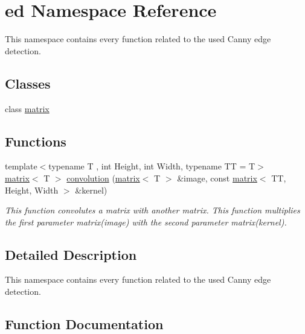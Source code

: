 \hypertarget{namespaceed}{}\section{ed Namespace Reference}
\label{namespaceed}


This namespace contains every function related to the used Canny edge detection.  


\subsection*{Classes}
\begin{DoxyCompactItemize}
\item 
class \mbox{\hyperlink{classed_1_1matrix}{matrix}}
\end{DoxyCompactItemize}
\subsection*{Functions}
\begin{DoxyCompactItemize}
\item 
{\footnotesize template$<$typename T , int Height, int Width, typename TT  = T$>$ }\\\mbox{\hyperlink{classed_1_1matrix}{matrix}}$<$ T $>$ \mbox{\hyperlink{namespaceed_aebe10857e20c7b3f680ce43f411d9492}{convolution}} (\mbox{\hyperlink{classed_1_1matrix}{matrix}}$<$ T $>$ \&image, const \mbox{\hyperlink{classed_1_1matrix}{matrix}}$<$ TT, Height, Width $>$ \&kernel)
\begin{DoxyCompactList}\small\item\em This function convolutes a matrix with another matrix. This function multiplies the first parameter matrix(image) with the second parameter matrix(kernel). \end{DoxyCompactList}\end{DoxyCompactItemize}


\subsection{Detailed Description}
This namespace contains every function related to the used Canny edge detection. 

\subsection{Function Documentation}
\mbox{\label{namespaceed_aebe10857e20c7b3f680ce43f411d9492}} 
